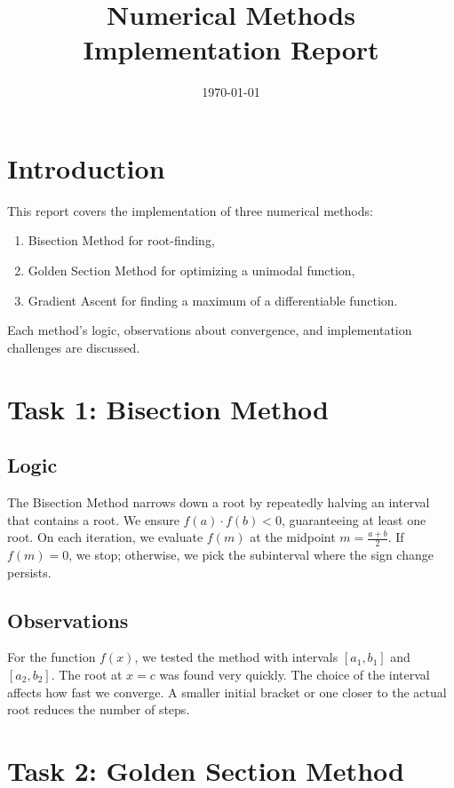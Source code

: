 \documentclass{article}
\title{Numerical Methods Implementation Report}
\author{}
\date{\today}
\begin{document}
\maketitle

\section*{Introduction}

This report covers the implementation of three numerical methods:
\begin{enumerate}
    \item Bisection Method for root-finding,
    \item Golden Section Method for optimizing a unimodal function,
    \item Gradient Ascent for finding a maximum of a differentiable function.
\end{enumerate}

Each method’s logic, observations about convergence, and implementation challenges are discussed.

\section{Task 1: Bisection Method}

\subsection{Logic}

The Bisection Method narrows down a root by repeatedly halving an interval that contains a root. We ensure \( f(a) \cdot f(b) < 0 \), guaranteeing at least one root. On each iteration, we evaluate \( f(m) \) at the midpoint \( m = \frac{a + b}{2} \). If \( f(m) = 0 \), we stop; otherwise, we pick the subinterval where the sign change persists.

\subsection{Observations}

For the function \( f(x) \), we tested the method with intervals \([a_1, b_1]\) and \([a_2, b_2]\). The root at \( x = c \) was found very quickly. The choice of the interval affects how fast we converge. A smaller initial bracket or one closer to the actual root reduces the number of steps.

\section{Task 2: Golden Section Method}
\end{document}
